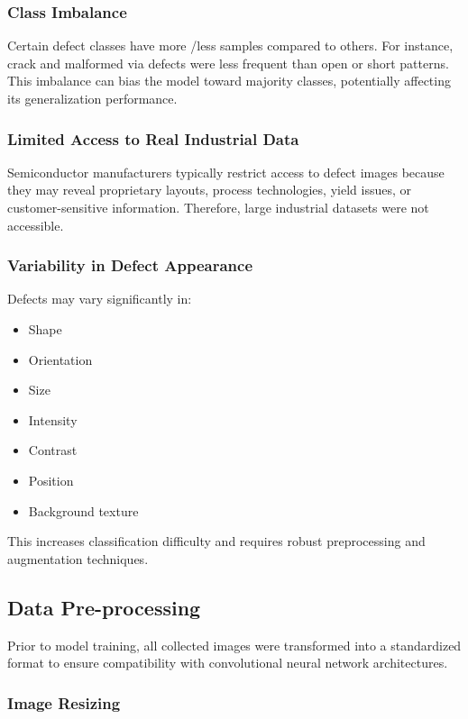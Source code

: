 \subsubsection{Class Imbalance}

Certain defect classes have more /less samples compared to others. For instance, crack and malformed via defects were less frequent than open or short patterns. This imbalance can bias the model toward majority classes, potentially affecting its generalization performance.

\subsubsection{Limited Access to Real Industrial Data}

Semiconductor manufacturers typically restrict access to defect images because they may reveal proprietary layouts, process technologies, yield issues, or customer-sensitive information. Therefore, large industrial datasets were not accessible.

\subsubsection {Variability in Defect Appearance}

Defects may vary significantly in:
\begin{itemize}
\item Shape
\item Orientation
\item Size
\item Intensity
\item Contrast
\item Position
\item Background texture
\end{itemize}
This increases classification difficulty and requires robust preprocessing and augmentation techniques.

\subsection{Data Pre-processing}
Prior to model training, all collected images were transformed into a standardized format to ensure compatibility with convolutional neural network architectures.

\subsubsection {Image Resizing}

